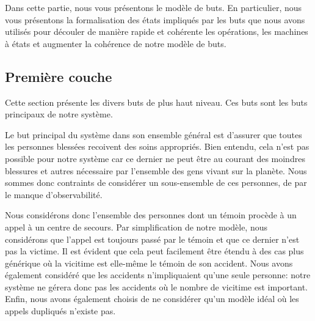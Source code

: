 Dans cette partie, nous vous présentons le modèle de buts. En 
particulier, nous vous présentons la formalisation des états impliqués
par les buts que nous avons
utilisés pour découler de manière rapide et cohérente les opérations, les
machines à états et augmenter la cohérence de notre modèle de buts.

\subsection{Première couche}

	Cette section présente les divers buts de plus haut niveau. Ces buts
	sont les buts principaux de notre système. 



	Le but principal du système dans son ensemble général est
	d'assurer que toutes les personnes blessées recoivent des soins 
	appropriés. Bien entendu, cela n'est pas possible pour notre
	système car ce dernier ne peut être au courant des moindres blessures
	et autres nécessaire par l'ensemble des gens vivant sur la planète.
	Nous sommes donc contraints de considérer un sous-ensemble de ces personnes,
	de par le manque d'observabilité. 
	
	Nous considérons donc l'ensemble des personnes dont un témoin procède à 
	un appel à un centre de secours. Par simplification de notre modèle, nous
	considérons que l'appel est toujours passé par le témoin et que ce dernier
	n'est pas la victime. Il est évident que cela peut facilement être étendu
	à des cas plus générique où la vicitime est elle-même le témoin de son
	accident. Nous avons également considéré que les accidents n'impliquaient
	qu'une seule personne: notre système ne gérera donc pas les accidents où
	le nombre de vicitime est important. Enfin, nous avons également choisis
	de ne considérer qu'un modèle idéal où les appels dupliqués n'existe pas.

